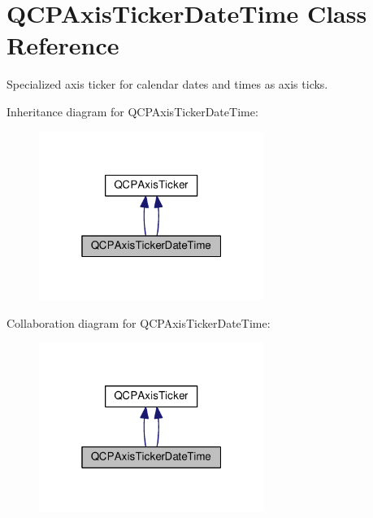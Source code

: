 \hypertarget{class_q_c_p_axis_ticker_date_time}{}\section{Q\+C\+P\+Axis\+Ticker\+Date\+Time Class Reference}
\label{class_q_c_p_axis_ticker_date_time}


Specialized axis ticker for calendar dates and times as axis ticks.  




Inheritance diagram for Q\+C\+P\+Axis\+Ticker\+Date\+Time\+:\nopagebreak
\begin{figure}[H]
\begin{center}
\leavevmode
\includegraphics[width=208pt]{class_q_c_p_axis_ticker_date_time__inherit__graph}
\end{center}
\end{figure}


Collaboration diagram for Q\+C\+P\+Axis\+Ticker\+Date\+Time\+:\nopagebreak
\begin{figure}[H]
\begin{center}
\leavevmode
\includegraphics[width=208pt]{class_q_c_p_axis_ticker_date_time__coll__graph}
\end{center}
\end{figure}
